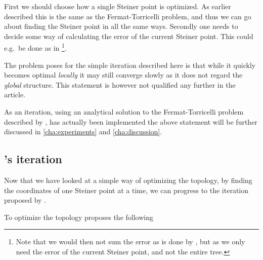 First we should choose how a single Steiner point is optimized. As earlier
described this is the same as the Fermat-Torricelli problem, and thus we can go
about finding the Steiner point in all the same ways. Secondly one needs to
decide some way of calculating the error of the current Steiner point. This
could e.g.\ be done as in \textcite{smith1992}\footnote{Note that we would then
  not sum the error as is done by \citeauthor{smith1992}, but as we only need
  the error of the current Steiner point, and not the entire tree.}.

The problem \citeauthor{smith1992} poses for the simple iteration described here is that while it
quickly becomes optimal \textit{locally} it may still converge slowly as it does not
regard the \textit{global} structure. This statement is however not qualified
any further in the article.

As an iteration, using an analytical solution to the Fermat-Torricelli problem
described by \textcite{uteshev2014}, has actually been implemented the above
statement will be further discussed in \cref{cha:experiments} and \cref{cha:discussion}.

\subsection{\citeauthor{smith1992}'s iteration}
\label{sec:smiths-iteration}

Now that we have looked at a simple way of optimizing the topology, by finding
the coordinates of one Steiner point at a time, we can progress to the iteration
proposed by \textcite{smith1992}.

To optimize the topology \citeauthor{smith1992} proposes the following

